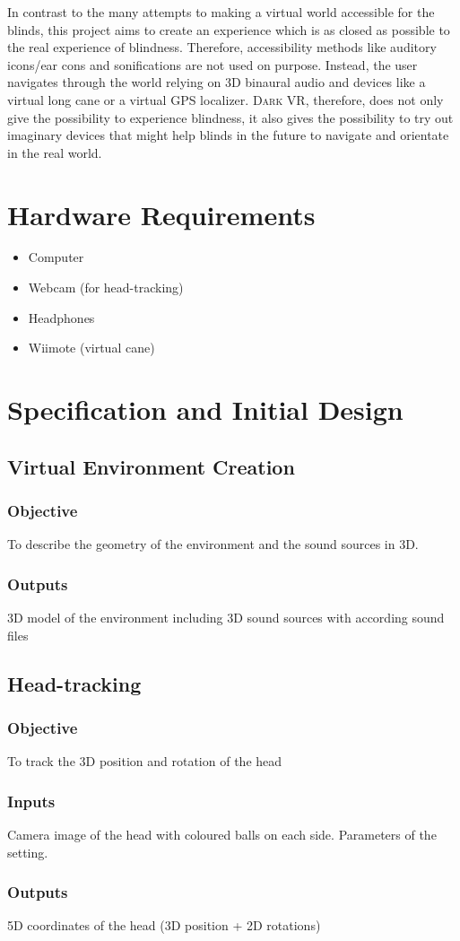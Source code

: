 \documentclass{assign}
\newcommand{\objectives}{\subsubsection{Objective}}
\newcommand{\inputs}{\subsubsection{Inputs}}
\newcommand{\outputs}{\subsubsection{Outputs}}
\begin{document}
In contrast to the many attempts to making a virtual world accessible for the
blinds, this project aims to create an experience which is as closed as
possible to the real experience of blindness. Therefore, accessibility methods
like auditory icons/ear cons and sonifications are not used on purpose. Instead,
the user navigates through the world relying on 3D binaural audio and devices
like a virtual long cane or a virtual GPS localizer. \textsc{Dark VR}, therefore,
does not only give the possibility to experience blindness, it also gives the
possibility to try out imaginary devices that might help blinds in the
future to navigate and orientate in the real world.

\section{Hardware Requirements}

\begin{itemize}
  \item Computer
  \item Webcam (for head-tracking)
  \item Headphones
  \item Wiimote (virtual cane)
\end{itemize}

\section{Specification and Initial Design}

\subsection{Virtual Environment Creation}

\objectives To describe the geometry of the environment and the sound
sources in 3D.

\outputs 3D model of the environment including 3D sound sources with according
sound files

\subsection{Head-tracking}

\objectives To track the 3D position and rotation of the head

\inputs Camera image of the head with coloured balls on each side. Parameters of
the setting.

\outputs 5D coordinates of the head (3D position + 2D rotations)
\end{document}

